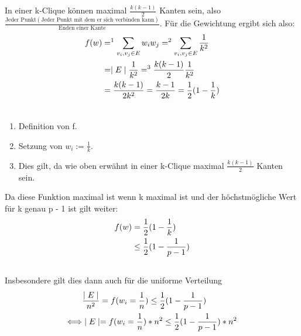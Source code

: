 \documentclass[12pt, a4paper]{article}
\begin{document}
In einer k-Clique können maximal $\frac{k (k-1)}{2}$ Kanten sein, also $\frac{\text{Jeder Punkt} (\text{Jeder Punkt mit dem er sich verbinden kann})}{\text{Enden einer Kante}}$. Für die Gewichtung ergibt sich also:
\begin{gather}
\begin{split}f(w) &=^1 \sum_{v_i, v_j \in E} w_i w_j =^2 \sum_{v_i, v_j \in E} \frac{1}{k^2}  \\
&= \mid E \mid \frac{1}{k^2} =^3 \frac{k (k-1)}{2} \frac{1}{k^2}  \\
&= \frac{k (k-1)}{2k^2} = \frac{k-1}{2k} = \frac{1}{2} (1 - \frac{1}{k})\end{split}\notag\\\begin{split}\end{split}\notag
\end{gather}\begin{enumerate}
\item {} 
Definition von f.

\item {} 
Setzung von $w_i := \frac{1}{k}$.

\item {} 
Dies gilt, da wie oben erwähnt in einer k-Clique maximal $\frac{k (k-1)}{2}$ Kanten sein.

\end{enumerate}

Da diese Funktion maximal ist wenn k maximal ist und der höchstmögliche Wert für k genau p - 1 ist gilt weiter:
\begin{gather}
\begin{split}f(w) &= \frac{1}{2} (1 - \frac{1}{k}) \\
&\le \frac{1}{2} (1 - \frac{1}{p-1})\end{split}\notag\\\begin{split}\end{split}\notag
\end{gather}
Insbesondere gilt dies dann auch für die uniforme Verteilung
\begin{gather}
\begin{split}&\frac{\mid E \mid}{n^2} = f(w_i = \frac{1}{n}) \le \frac{1}{2} (1 - \frac{1}{p-1}) \\
\Longleftrightarrow &\mid E \mid = f(w_i = \frac{1}{n}) * n^2 \le \frac{1}{2} (1 - \frac{1}{p-1}) * n^2\end{split}\notag\\\begin{split}\end{split}\notag
\end{gather}
\end{document}
